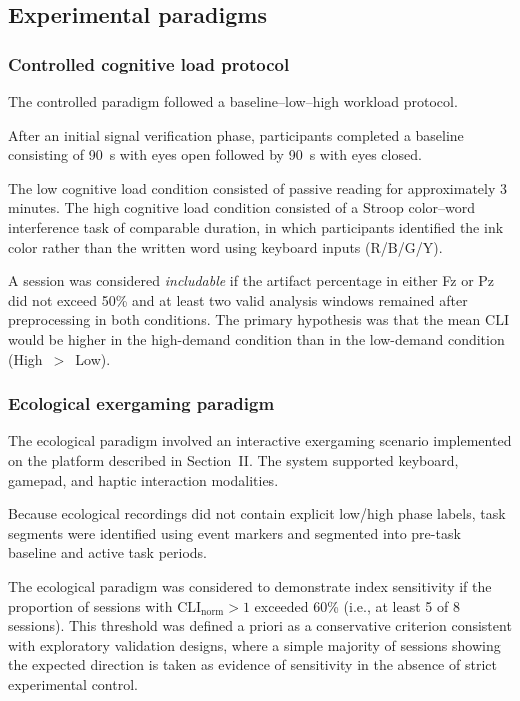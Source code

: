 \documentclass[10pt]{iopart}
\begin{document}
\subsection{Experimental paradigms}
\subsubsection{Controlled cognitive load protocol}

The controlled paradigm followed a baseline--low--high workload protocol.

After an initial signal verification phase, participants completed a baseline consisting of 90~s with eyes open followed by 90~s with eyes closed.

The low cognitive load condition consisted of passive reading for approximately 3 minutes. The high cognitive load condition consisted of a Stroop color--word interference task of comparable duration, in which participants identified the ink color rather than the written word using keyboard inputs (R/B/G/Y).

A session was considered \emph{includable} if the artifact
percentage in either Fz or Pz did not exceed 50\% and at least
two valid analysis windows remained after preprocessing in both
conditions. The primary hypothesis was that the mean
$\mathrm{CLI}$ would be higher in the high-demand condition
than in the low-demand condition (High~$>$~Low).

\subsubsection{Ecological exergaming paradigm}
\label{sec:ecological_paradigm}

The ecological paradigm involved an interactive exergaming scenario implemented on the platform described in Section~II. The system supported keyboard, gamepad, and haptic interaction modalities.

Because ecological recordings did not contain explicit low/high
phase labels, task segments were identified using event markers
and segmented into pre-task baseline and active task periods.

The ecological paradigm was considered to demonstrate index
sensitivity if the proportion of sessions with
$\mathrm{CLI}_{\mathrm{norm}} > 1$ exceeded 60\% (i.e., at least
5 of 8 sessions). This threshold was defined a priori as a
conservative criterion consistent with exploratory validation
designs, where a simple majority of sessions showing the expected
direction is taken as evidence of sensitivity in the absence of
strict experimental control.
\end{document}
